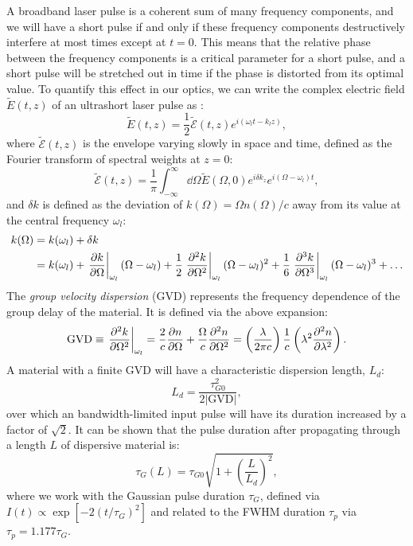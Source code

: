 A broadband laser pulse is a coherent sum of many frequency components, and we will have a short pulse if and only if these frequency components destructively interfere at most times except at $t=0$. This means that the relative phase between the frequency components is a critical parameter for a short pulse, and a short pulse will be stretched out in time if the phase is distorted from its optimal value. To quantify this effect in our optics, we can write the complex electric field $\tilde{E}(t, z)$ of an ultrashort laser pulse as \cite{dielsUltrashortLaserPulse2006}:
\begin{equation}
\tilde{E}(t, z) = \frac{1}{2} \tilde{\mathcal{E}}(t,z) e^{i (\omega_l t - k_l z)},
\end{equation}
where $\tilde{\mathcal{E}}(t,z)$ is the envelope varying slowly in space and time, defined as the Fourier transform of spectral weights at $z=0$:
\begin{equation}
\tilde{\mathcal{E}}(t,z) = \frac{1}{\pi} \int_{-\infty}^{\infty} \dd{\Omega} \tilde{E}(\Omega, 0) e^{i \delta k_z} e^{i(\Omega-\omega_l)t},
\end{equation}
and $\delta k$ is defined as the deviation of $k(\Omega) = \Omega n(\Omega) / c$ away from its value at the central frequency $\omega_l$:
\begin{equation}
\begin{aligned}
k(\Omega) &= k(\omega_l) + \delta k \\
&= k(\omega_l) + \eval{\pdv{k}{\Omega}}_{\omega_l} (\Omega - \omega_l) + \frac{1}{2} \eval{\pdv[2]{k}{\Omega}}_{\omega_l} (\Omega - \omega_l)^2 + \frac{1}{6} \eval{\pdv[3]{k}{\Omega}}_{\omega_l} (\Omega-\omega_l)^3 + \ldots
\end{aligned}
\end{equation}
The \textit{group velocity dispersion} (GVD) represents the frequency dependence of the group delay of the material. It is defined via the above expansion:
\begin{equation}
\textrm{GVD} \equiv \eval{\pdv[2]{k}{\Omega}}_{\omega_l} = \frac{2}{c} \pdv{n}{\Omega} + \frac{\Omega}{c} \pdv[2]{n}{\Omega} = \left( \frac{\lambda}{2 \pi c}\right) \frac{1}{c} \left( \lambda^2 \pdv[2]{n}{\lambda} \right).
\end{equation}
A material with a finite GVD will have a characteristic dispersion length, $L_d$:
\begin{equation}
L_d = \frac{\tau_{G0}^2}{2 |\textrm{GVD}|},
\end{equation}
over which an bandwidth-limited input pulse will have its duration increased by a factor of $\sqrt{2}$. It can be shown that the pulse duration after propagating through a length $L$ of dispersive material is:
\begin{equation}
\tau_G(L) = \tau_{G0} \sqrt{1 + \left(\frac{L}{L_d}\right)^2},
\label{eqn:pulse_broadening}
\end{equation}
where we work with the Gaussian pulse duration $\tau_G$, defined via $I(t) \propto \exp[-2(t/\tau_G)^2]$ and related to the FWHM duration $\tau_p$ via $\tau_p = 1.177 \tau_G$.

